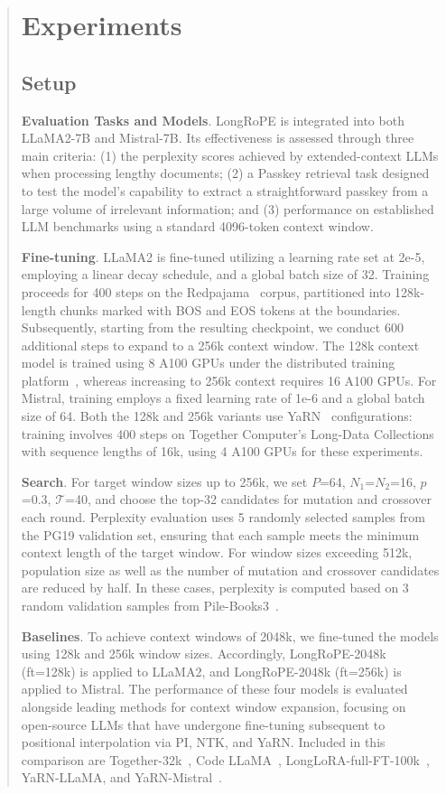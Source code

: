 \begin{abstract}
 \section{Experiments}

\label{sec:exp}
\subsection{Setup}
\textbf{Evaluation Tasks and Models}. LongRoPE is integrated into both LLaMA2-7B and Mistral-7B. Its effectiveness is assessed through three main criteria: (1) the perplexity scores achieved by extended-context LLMs when processing lengthy documents; (2) a Passkey retrieval task designed to test the model’s capability to extract a straightforward passkey from a large volume of irrelevant information; and (3) performance on established LLM benchmarks using a standard 4096-token context window.

\textbf{Fine-tuning}. LLaMA2 is fine-tuned utilizing a learning rate set at 2e-5, employing a linear decay schedule, and a global batch size of 32. Training proceeds for 400 steps on the Redpajama~\cite{redpajama} corpus, partitioned into 128k-length chunks marked with BOS and EOS tokens at the boundaries. Subsequently, starting from the resulting checkpoint, we conduct 600 additional steps to expand to a 256k context window. The 128k context model is trained using 8 A100 GPUs under the distributed training platform~\cite{cube}, whereas increasing to 256k context requires 16 A100 GPUs. For Mistral, training employs a fixed learning rate of 1e-6 and a global batch size of 64. Both the 128k and 256k variants use YaRN~\cite{yarn} configurations: training involves 400 steps on Together Computer's Long-Data Collections~\cite{mistraldata} with sequence lengths of 16k, using 4 A100 GPUs for these experiments.

\textbf{Search}. For target window sizes up to 256k, we set $P$=64, $N_1$=$N_2$=16, $p$=0.3, $\mathcal{T}$=40, and choose the top-32 candidates for mutation and crossover each round. Perplexity evaluation uses 5 randomly selected samples from the PG19 validation set, ensuring that each sample meets the minimum context length of the target window. For window sizes exceeding 512k, population size as well as the number of mutation and crossover candidates are reduced by half. In these cases, perplexity is computed based on 3 random validation samples from Pile-Books3~\cite{pile}.

\textbf{Baselines}. To achieve context windows of 2048k, we fine-tuned the models using 128k and 256k window sizes. Accordingly, LongRoPE-2048k (ft=128k) is applied to LLaMA2, and LongRoPE-2048k (ft=256k) is applied to Mistral. The performance of these four models is evaluated alongside leading methods for context window expansion, focusing on open-source LLMs that have undergone fine-tuning subsequent to positional interpolation via PI, NTK, and YaRN. Included in this comparison are Together-32k~\cite{together}, Code LLaMA~\cite{codellama}, LongLoRA-full-FT-100k~\cite{longlora}, YaRN-LLaMA, and YaRN-Mistral~\cite{yarn}.


\end{abstract}
